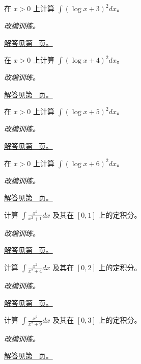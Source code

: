 \documentclass[12pt,fontset=fandol]{ctexart}
\begin{document}
\begin{example}[对数平方的分部积分]\label{ex:c15q15}
在 $x>0$ 上计算 $\displaystyle\int(\log x+3)^2dx$。
\par\textit{改编训练。}\par\hyperref[ans:c15q15]{解答见第~\pageref{ans:c15q15} 页。}
\end{example}
\begin{example}[对数平方的分部积分]\label{ex:c15q16}
在 $x>0$ 上计算 $\displaystyle\int(\log x+4)^2dx$。
\par\textit{改编训练。}\par\hyperref[ans:c15q16]{解答见第~\pageref{ans:c15q16} 页。}
\end{example}
\begin{example}[对数平方的分部积分]\label{ex:c15q17}
在 $x>0$ 上计算 $\displaystyle\int(\log x+5)^2dx$。
\par\textit{改编训练。}\par\hyperref[ans:c15q17]{解答见第~\pageref{ans:c15q17} 页。}
\end{example}
\begin{example}[对数平方的分部积分]\label{ex:c15q18}
在 $x>0$ 上计算 $\displaystyle\int(\log x+6)^2dx$。
\par\textit{改编训练。}\par\hyperref[ans:c15q18]{解答见第~\pageref{ans:c15q18} 页。}
\end{example}
\begin{example}[先拆分再积分的有理式]\label{ex:c15q19}
计算 $\displaystyle\int\frac{x^2}{x^2+1}dx$ 及其在 $[0,1]$ 上的定积分。
\par\textit{改编训练。}\par\hyperref[ans:c15q19]{解答见第~\pageref{ans:c15q19} 页。}
\end{example}
\begin{example}[先拆分再积分的有理式]\label{ex:c15q20}
计算 $\displaystyle\int\frac{x^2}{x^2+4}dx$ 及其在 $[0,2]$ 上的定积分。
\par\textit{改编训练。}\par\hyperref[ans:c15q20]{解答见第~\pageref{ans:c15q20} 页。}
\end{example}
\begin{example}[先拆分再积分的有理式]\label{ex:c15q21}
计算 $\displaystyle\int\frac{x^2}{x^2+9}dx$ 及其在 $[0,3]$ 上的定积分。
\par\textit{改编训练。}\par\hyperref[ans:c15q21]{解答见第~\pageref{ans:c15q21} 页。}
\end{example}
\end{document}
